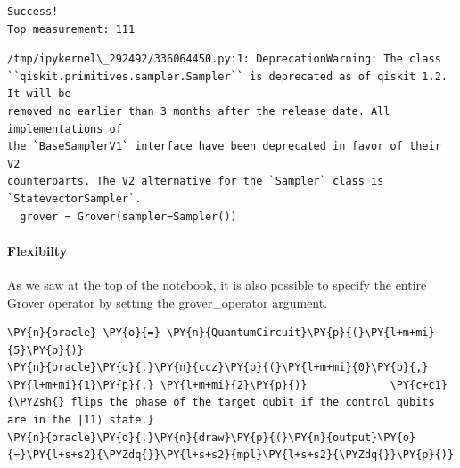     \begin{Verbatim}[commandchars=\\\{\}]
Success!
Top measurement: 111
    \end{Verbatim}

    \begin{Verbatim}[commandchars=\\\{\}]
/tmp/ipykernel\_292492/336064450.py:1: DeprecationWarning: The class
``qiskit.primitives.sampler.Sampler`` is deprecated as of qiskit 1.2. It will be
removed no earlier than 3 months after the release date. All implementations of
the `BaseSamplerV1` interface have been deprecated in favor of their V2
counterparts. The V2 alternative for the `Sampler` class is
`StatevectorSampler`.
  grover = Grover(sampler=Sampler())
    \end{Verbatim}

    \hypertarget{flexibilty}{%
\paragraph{Flexibilty}\label{flexibilty}}

As we saw at the top of the notebook, it is also possible to specify the
entire Grover operator by setting the grover\_operator argument.

    \begin{tcolorbox}[breakable, size=fbox, boxrule=1pt, pad at break*=1mm,colback=cellbackground, colframe=cellborder]
\begin{Verbatim}[commandchars=\\\{\}]
\PY{n}{oracle} \PY{o}{=} \PY{n}{QuantumCircuit}\PY{p}{(}\PY{l+m+mi}{5}\PY{p}{)}
\PY{n}{oracle}\PY{o}{.}\PY{n}{ccz}\PY{p}{(}\PY{l+m+mi}{0}\PY{p}{,} \PY{l+m+mi}{1}\PY{p}{,} \PY{l+m+mi}{2}\PY{p}{)}             \PY{c+c1}{\PYZsh{} flips the phase of the target qubit if the control qubits are in the ∣11⟩ state.}
\PY{n}{oracle}\PY{o}{.}\PY{n}{draw}\PY{p}{(}\PY{n}{output}\PY{o}{=}\PY{l+s+s2}{\PYZdq{}}\PY{l+s+s2}{mpl}\PY{l+s+s2}{\PYZdq{}}\PY{p}{)}
\end{Verbatim}
\end{tcolorbox}
 
            
    
    \begin{center}
    \end{center}
    { \hspace*{\fill} \\}
    


